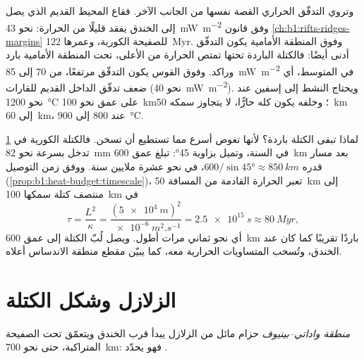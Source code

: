 \begin{omfigure}
\label{fig:b1:active-margins:profiles}
\end{omfigure}

وتروي التدفّق الحراري القصة نفسها من الجانب الآخر. فقاع المحيط القديم الذي يصل إلى الخندق يفقد قليلًا من الحرارة: نحو \qty{43}{mW.m^{-2}} وفق قانون \cref{ch:b1:rifts-ridges-margins} للصفيحة الكورية، وعمرها \qty{122}{Myr}. وفوق المنطقة الأمامية يكون التدفّق أدنى أيضًا: فالكتلة الباردة تحتها تمتص الحرارة من الأعلى،  تحت المنطقة الأمامية بارد وراكد. وفوق القوس  يكون التدفّق مرتفعًا، من 70 إلى \qty{85}{mW.m^{-2}} في المتوسط، أي ضعف تدفّق الداخل القديم للقارات (نحو \qty{40}{mW.m^{-2}}). ويحتاج  النشط إلى إسفين  عند نحو \qty{1200}{\celsius} على عمق نحو \qty{100}{km}؛ وخلفه يكون  كله حارًّا،  لا يتجاوز سمكه \qty{50}{km} إلى \qty{60}{km}،  عند 800 إلى \qty{900}{\celsius}.

لماذا تبقى الكتلة باردة؟ لأنها تغوص أسرع مما تستطيع أن تسخن. فالكتلة الكورية في \cref{sec:b1:active-margins:seismicity} تدخل بسرعة نحو \qty{82}{mm} في السنة، وتميل بزاوية \ang{45}: تبلغ عمق \qty{600}{km} بعد مسار قدره $600/\sin\ang{45} \approx \qty{850}{km}$، في نحو عشرة ملايين سنة. ووفق زمن التوصيل (\cref{prop:b1:heat-budget:timescale})، تعبر الحرارة القادمة من  المسافة \qty{50}{km} إلى منتصف كتلة سمكها \qty{100}{km} في
\[
  \tau = \frac{L^2}{\kappa} = \frac{(\qty{5e4}{m})^2}{\qty{e-6}{m^2.s^{-1}}}
  = \qty{2.5e15}{s} \approx \qty{80}{Myr},
\]
أي نحو ثماني مرات أطول. ويصل لُبّ الكتلة إلى عمق \qty{600}{km} باردًا تقريبًا كما كان عند الخندق، وتُسحب المتساويات الحرارية معه، كما يبيّن مقطع منطقة الاندساس أعلاه.

\section{الزلازل وشكل الكتلة}\label{sec:b1:active-margins:seismicity}

\begin{definition}\label{def:b1:active-margins:wadati-benioff}
\emph{منطقة واداتي–بينيوف} حزام مائل من الزلازل يبدأ قرب الخندق ويتعمّق تحت الصفيحة المتراكبة، حتى نحو \qty{700}{km}: فهو يحدّد .
\end{definition}

